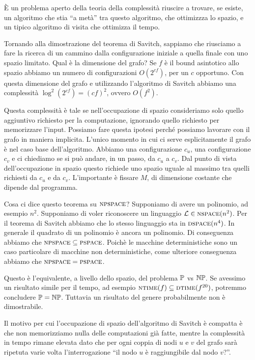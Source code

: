 È un problema aperto della teoria della complessità riuscire a trovare, se esiste, un algoritmo
che stia ``a metà'' tra questo algoritmo, che ottimizzza lo spazio, e un tipico algoritmo di visita
che ottimizza il tempo.

Tornando alla dimostrazione del teorema di Savitch, sappiamo che riusciamo a fare la ricerca di un
cammino dalla configurazione iniziale a quella finale con uno spazio limitato. Qual è la dimensione
del grafo? Se $f$ è il bound asintotico allo spazio abbiamo un numero di configurazioni
$O(2^{cf})$, per un $c$ opportuno. Con questa dimensione del grafo e utilizzando l'algoritmo di
Savitch abbiamo una complessità $\log^{2}(2^{cf}) = (cf)^{2}$, ovvero $O(f^{2})$.

Questa complessità è tale se nell'occupazione di spazio consideriamo solo quello aggiuntivo
richiesto per la computazione, ignorando quello richiesto per memorizzare l'input. Possiamo fare
questa ipotesi perché possiamo lavorare con il grafo in maniera implicita. L'unico momento in cui
ci serve esplicitamente il grafo è nel caso base dell'algoritmo. Abbiamo una configurazione
$c_{u}$, una configurazione $c_{v}$ e ci chiediamo se si può andare, in un passo, da $c_{u}$ a
$c_{v}$. Dal punto di vista dell'occupazione in spazio questo richiede uno spazio uguale al massimo
tra quelli richiesti da $c_{u}$ e da $c_{v}$. L'importante è fissare $M$, di dimensione costante
che dipende dal programma.

Cosa ci dice questo teorema su $\textsc{npspace}$? Supponiamo di avere un polinomio, ad esempio $n^{2}$.
Supponiamo di voler riconoscere un linguaggio $\mathcal{L} \in \textsc{nspace}(n^{2})$. Per il teorema di Savitch
abbiamo che lo stesso linguaggio sta in $\textsc{dspace}(n^{4})$. In generale il quadrato di un polinomio è
ancora un polinomio. Di conseguenza abbiamo che $\textsc{npspace} \subseteq \textsc{pspace}$. Poichè le macchine
deterministiche sono un caso particolare di macchine non deterministiche, come ulteriore conseguenza
abbiamo che $\textsc{npspace} = \textsc{pspace}$.

Questo è l'equivalente, a livello dello spazio, del problema $\mathbb{P}$ vs $\mathbb{NP}$. Se avessimo
un risultato simile per il tempo, ad esempio $\textsc{ntime}(f) \subseteq \textsc{dtime}(f^{20})$, potremmo
concludere $\mathbb{P} = \mathbb{NP}$. Tuttavia un risultato del genere probabilmente non è dimostrabile.

Il motivo per cui l'occupazione di spazio dell'algoritmo di Savitch è compatta è che non
memorizziamo nulla delle computazioni già fatte, mentre la complessità in tempo rimane elevata
dato che per ogni coppia di nodi $u$ e $v$ del grafo sarà ripetuta varie volta l'interrogazione
``il nodo $u$ è raggiungibile dal nodo $v$?''.

